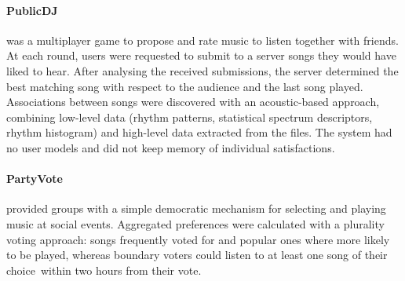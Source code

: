 \paragraph{PublicDJ} %
\label{par:publicdj_leitich07}
\cite{Leitich07} was a multiplayer game to propose and rate music to listen together with friends.
At each round, users were requested to submit to a server songs they would have liked to hear. 
After analysing the received submissions, the server determined the best matching song with respect to the audience and the last song played. 
Associations between songs were discovered with an acoustic-based approach, combining low-level data (rhythm patterns, statistical spectrum descriptors, rhythm histogram) and high-level data extracted from the files.
The system had no user models and did not keep memory of individual satisfactions.


\paragraph{PartyVote} %
\label{par:party_vote}
\cite{Sprague08} provided groups with a simple democratic mechanism for selecting and playing music at social events.
Aggregated preferences were calculated with a plurality voting approach: songs frequently voted for and popular ones where more likely to be played, whereas boundary voters could listen to at least one song of their choice within two hours from their vote.

